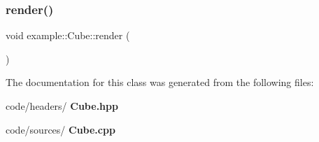 \subsubsection{render()}
{\footnotesize\ttfamily void example\+::\+Cube\+::render (\begin{DoxyParamCaption}{ }\end{DoxyParamCaption})}



The documentation for this class was generated from the following files\+:\begin{DoxyCompactItemize}
\item 
code/headers/\textbf{ Cube.\+hpp}\item 
code/sources/\textbf{ Cube.\+cpp}\end{DoxyCompactItemize}
